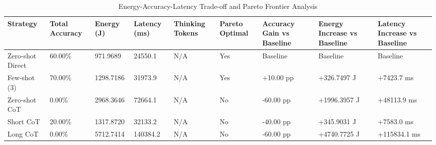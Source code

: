\begin{table}
\caption{Energy-Accuracy-Latency Trade-off and Pareto Frontier Analysis}
\label{tab:tradeoff_comparison}
\begin{tabular}{lllllllll}
\toprule
Strategy & Total Accuracy & Energy (J) & Latency (ms) & Thinking Tokens & Pareto Optimal & Accuracy Gain vs Baseline & Energy Increase vs Baseline & Latency Increase vs Baseline \\
\midrule
Zero-shot Direct & 60.00\% & 971.9689 & 24550.1 & N/A & Yes & Baseline & Baseline & Baseline \\
Few-shot (3) & 70.00\% & 1298.7186 & 31973.9 & N/A & Yes & +10.00 pp & +326.7497 J & +7423.7 ms \\
Zero-shot CoT & 0.00\% & 2968.3646 & 72664.1 & N/A & No & -60.00 pp & +1996.3957 J & +48113.9 ms \\
Short CoT & 20.00\% & 1317.8720 & 32133.2 & N/A & No & -40.00 pp & +345.9031 J & +7583.0 ms \\
Long CoT & 0.00\% & 5712.7414 & 140384.2 & N/A & No & -60.00 pp & +4740.7725 J & +115834.1 ms \\
\bottomrule
\end{tabular}
\end{table}
